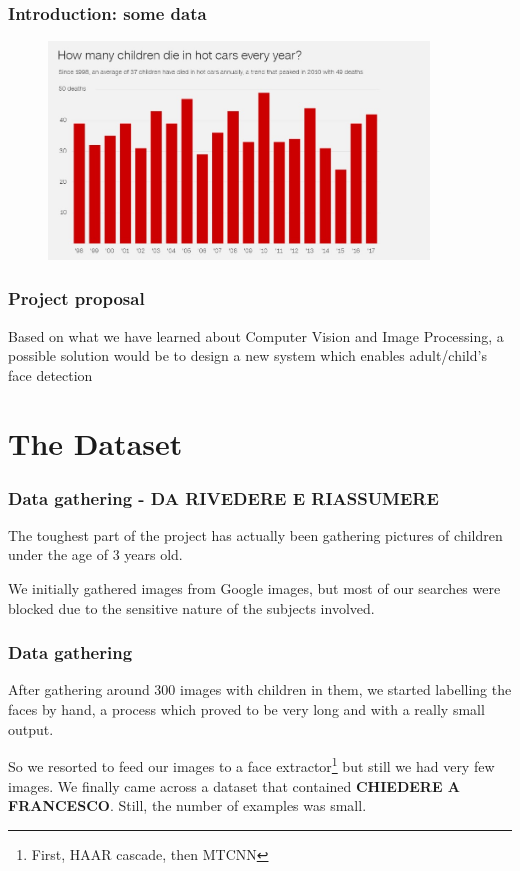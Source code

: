 \documentclass{beamer}
\begin{document}
	\begin{frame}
		\frametitle{Introduction: some data}
		\begin{figure}
			\centering
			\includegraphics[width=0.9\textwidth]{img/histo-by-year.png}
			\label{fig:heatstroke_year}
		\end{figure}		
	\end{frame}

	\begin{frame}
		\frametitle{Project proposal}
		Based on what we have learned about Computer Vision and Image Processing, a possible solution would be to design a new system which enables adult/child's face detection %
	\end{frame}
	
	\section{The Dataset}
	
	\begin{frame}
		\frametitle{Data gathering - DA RIVEDERE E RIASSUMERE}
		The toughest part of the project has actually been gathering pictures of children under the age of 3 years old.
	
		We initially gathered images from Google images, but most of our searches were blocked due to the sensitive nature of the subjects involved.
	\end{frame}

	\begin{frame}
		\frametitle{Data gathering}
		After gathering around 300 images with children in them, we started labelling the faces by hand, a process which proved to be very long and with a really small output.
	
		So we resorted to feed our images to a face extractor\footnote{First, HAAR cascade, then MTCNN} but still we had very few images.
		We finally came across a dataset that contained \textbf{CHIEDERE A FRANCESCO}. Still, the number of examples was small.
	\end{frame}
\end{document}
